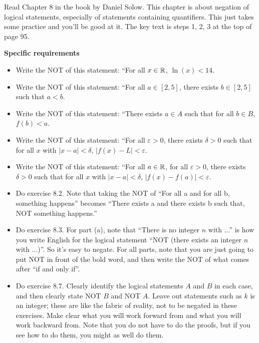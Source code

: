 
Read Chapter 8 in the book by Daniel Solow.
This chapter is about negation of logical statements, especially of statements containing quantifiers.
This just takes some practice and you'll be good at it.
The key text is steps 1, 2, 3 at the top of page 95.


\vspace{0.1in}
\noindent
{\bf Specific requirements}
\vspace*{-0.15in}

\begin{itemize}
\item Write the NOT of this statement:  ``For all $x \in \mathbb{R}$, $\ln(x) < 14$.

\item Write the NOT of this statement:  ``For all $a \in [2,5]$, there exists $b \in [2,5]$ such that $a < b$.

\item Write the NOT of this statement:  ``There exists $a \in A$ such that for all $b \in B$, $f(b) < a$.

\item Write the NOT of this statement:  ``For all $\varepsilon > 0$, there exists $\delta > 0$ such that for all $x$ with $|x-a| < \delta$, $|f(x) - L| < \varepsilon$.

\item Write the NOT of this statement:  ``For all $a \in \mathbb{R}$, for all $\varepsilon > 0$, there exists $\delta > 0$ such that for all $x$ with $|x-a| < \delta$, $|f(x) - f(a)| < \varepsilon$.

\item Do exercise 8.2.  Note that  taking the NOT of ``For all a and for all b, something happens'' becomes ``There exists a and there exists b such that, NOT something happens.''

\item Do exercise 8.3.  For part (a), note that ``There is no integer $n$ with ...'' is how you write English for the logical statement ``NOT (there exists an integer $n$ with ...)''.  So it's easy to negate.  For all parts, note that you are just going to put NOT in front of the bold word, and then write the NOT of what comes after ``if and only if''.

\item Do exercise 8.7.  Clearly identify the logical statements $A$ and $B$ in each case, and then clearly state NOT $B$ and NOT $A$.  Leave out statements such as $k$ is an integer; these are like the fabric of reality, not to be negated in these exercises.  Make clear what you will work forward from and what you will work backward from.  Note that you do not have to do the proofs, but if you see how to do them, you might as well do them.


\end{itemize}
